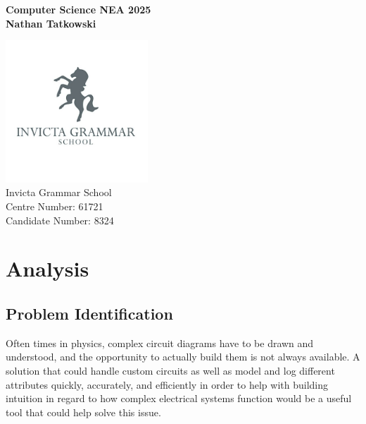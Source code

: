 \documentclass[11pt]{article}
\begin{document}
    \pagestyle{fancy}
    \setlength{\headheight}{13.6pt}

    \begin{titlepage}
        \begin{center}
            \vspace*{1cm}
            \Huge
            \textbf{Computer Science NEA 2025} \\
            \vspace*{2cm}
            \LARGE
            \textbf{Nathan Tatkowski}

            \vfill
            \includegraphics*[width=0.4\textwidth]{figures/igsLogo.jpg} \\
            \Large
            Invicta Grammar School \\
            Centre Number: 61721 \\
            Candidate Number: 8324
        \end{center}
    \end{titlepage}

    \tableofcontents

    \pagebreak



    \section{Analysis}

        \subsection{Problem Identification}
            Often times in physics, complex circuit diagrams have to be drawn and understood, and the opportunity to actually build them is not always available. A solution that could handle custom circuits as well as model and log different attributes quickly, accurately, and efficiently in order to help with building intuition in regard to how complex electrical systems function would be a useful tool that could help solve this issue.
\end{document}
